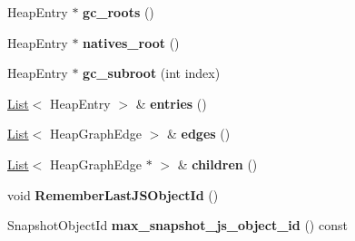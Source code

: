 \begin{DoxyCompactItemize}
\item 
\hypertarget{classv8_1_1internal_1_1_heap_snapshot_aa85f48da92de18a6e9eeb1097a80b4e3}{}Heap\+Entry $\ast$ {\bfseries gc\+\_\+roots} ()\label{classv8_1_1internal_1_1_heap_snapshot_aa85f48da92de18a6e9eeb1097a80b4e3}

\item 
\hypertarget{classv8_1_1internal_1_1_heap_snapshot_a70d42345de35bb53a65002f332d2719b}{}Heap\+Entry $\ast$ {\bfseries natives\+\_\+root} ()\label{classv8_1_1internal_1_1_heap_snapshot_a70d42345de35bb53a65002f332d2719b}

\item 
\hypertarget{classv8_1_1internal_1_1_heap_snapshot_ad9e130b78fcc810d3835752c1d069069}{}Heap\+Entry $\ast$ {\bfseries gc\+\_\+subroot} (int index)\label{classv8_1_1internal_1_1_heap_snapshot_ad9e130b78fcc810d3835752c1d069069}

\item 
\hypertarget{classv8_1_1internal_1_1_heap_snapshot_a3f1be573b72409ec46e2bb879722c8d9}{}\hyperlink{classv8_1_1internal_1_1_list}{List}$<$ Heap\+Entry $>$ \& {\bfseries entries} ()\label{classv8_1_1internal_1_1_heap_snapshot_a3f1be573b72409ec46e2bb879722c8d9}

\item 
\hypertarget{classv8_1_1internal_1_1_heap_snapshot_a95cb3d37dcc3cee74f57b6d7014047d5}{}\hyperlink{classv8_1_1internal_1_1_list}{List}$<$ Heap\+Graph\+Edge $>$ \& {\bfseries edges} ()\label{classv8_1_1internal_1_1_heap_snapshot_a95cb3d37dcc3cee74f57b6d7014047d5}

\item 
\hypertarget{classv8_1_1internal_1_1_heap_snapshot_a4a458a15c70397764060821cf9b27a39}{}\hyperlink{classv8_1_1internal_1_1_list}{List}$<$ Heap\+Graph\+Edge $\ast$ $>$ \& {\bfseries children} ()\label{classv8_1_1internal_1_1_heap_snapshot_a4a458a15c70397764060821cf9b27a39}

\item 
\hypertarget{classv8_1_1internal_1_1_heap_snapshot_a728b4c7878a21901a906fca5f0880d98}{}void {\bfseries Remember\+Last\+J\+S\+Object\+Id} ()\label{classv8_1_1internal_1_1_heap_snapshot_a728b4c7878a21901a906fca5f0880d98}

\item 
\hypertarget{classv8_1_1internal_1_1_heap_snapshot_a0f0380a6a599542acc0fa62b6223a059}{}Snapshot\+Object\+Id {\bfseries max\+\_\+snapshot\+\_\+js\+\_\+object\+\_\+id} () const \label{classv8_1_1internal_1_1_heap_snapshot_a0f0380a6a599542acc0fa62b6223a059}


\end{DoxyCompactItemize}
